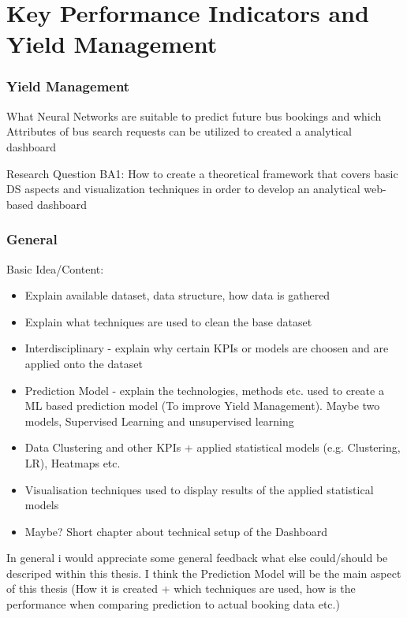 %
%
% 
% 
% 

\chapter{Key Performance Indicators and Yield Management}
\label{chap:kpi}



\subsection{Yield Management}
What Neural Networks are suitable to predict future bus bookings and which Attributes of bus search requests can be utilized to created a analytical dashboard


Research Question BA1: How to create a theoretical framework that covers basic DS
aspects and visualization techniques in order to develop an analytical web-based dashboard



\subsection{General}
Basic Idea/Content: \newline

\begin{itemize}
  \item Explain available dataset, data structure, how data is gathered 
  \item Explain what techniques are used to clean the base dataset
  \item Interdisciplinary - explain why certain KPIs or models are choosen and are applied onto the dataset 
  \item Prediction Model - explain the technologies, methods etc. used to create a ML based prediction model (To improve Yield Management). Maybe two models, Supervised Learning and unsupervised learning 
  \item Data Clustering and other KPIs + applied statistical models (e.g. Clustering, LR), Heatmaps etc. 
  \item Visualisation techniques used to display results of the applied statistical models 
  \item Maybe? Short chapter about technical setup of the Dashboard   
\end{itemize}
In general i would appreciate some general feedback what else could/should be descriped within this thesis. I think the Prediction Model will be the main aspect of this thesis (How it is created + which techniques are used, how is the performance when comparing prediction to actual booking data etc.) 




